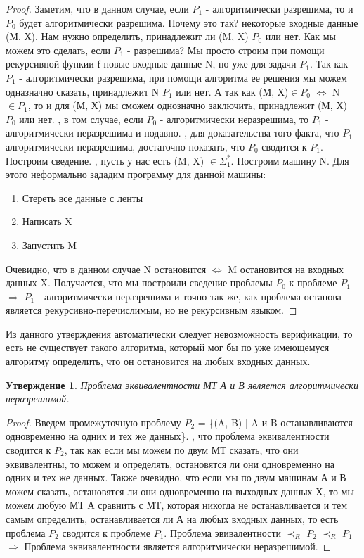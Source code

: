\documentclass[a4paper]{article}
\newtheorem{statement}{Утверждение}
\begin{document}
{\begin{proof}
Заметим, что в данном случае, если $P_1$ - алгоритмически разрешима, то и $P_0$ будет алгоритмически разрешима. Почему это так? 
 некоторые входные данные (М, Х). Нам нужно определить, принадлежит ли (M, X) $P_0$ или нет. Как мы можем это сделать, если $P_1$ - разрешима? Мы просто строим при помощи рекурсивной функии f новые входные данные N, но уже для задачи $P_1$. Так как $P_1$ - алгоритмически разрешима, при помощи алгоритма ее решения мы можем одназначно сказать, принадлежит N $P_1$ или нет. А так как (М, Х)$\in P_0$ $\Leftrightarrow$ N$\in P_1$, то и для (М, Х) мы сможем однозначно заключить, принадлежит (М, Х) $P_0$ или нет.
, в том случае, если $P_0$ - алгоритмически неразрешима, то $P_1$ - алгоритмически неразрешима и подавно. 
, для доказательства того факта, что $P_1$ алгоритмически неразрешима, достаточно показать, что $P_0$ сводится к $P_1$.
Построим сведение.
, пусть у нас есть (M, X) $\in \Sigma^*_1$. Построим машину N. Для этого неформально зададим программу для данной машины:
\begin{enumerate}
\item Стереть все данные с ленты
\item Написать X
\item Запустить M
\end{enumerate}
Очевидно, что в данном случае N остановится $\Leftrightarrow$ M остановится на входных данных X. Получается, что мы построили сведение проблемы $P_0$ к проблеме $P_1$ $\Rightarrow$ $P_1$ - алгоритмически неразрешима и точно так же, как проблема останова является рекурсивно-перечислимым, но не рекурсивным языком.
\end{proof}
Из данного утверждения автоматически следует невозможность верификации, то есть не существует такого алгоритма, который мог бы по уже имеющемуся алгоритму определить, что он остановится на любых входных данных.
\begin{statement}
Проблема эквивалентности МТ А и В является алгоритмически неразрешимой.
\end{statement}
\begin{proof}
Введем промежуточную проблему $P_2$ = \{(A, B) | A и B останавливаются одновременно на одних и тех же данных\}.
, что проблема эквивалентности сводится к $P_2$, так как если мы можем по двум МТ сказать, что они эквивалентны, то можем и определять, остановятся ли они одновременно на одних и тех же данных. 
\newline Также очевидно, что если мы по двум машинам А и В можем сказать, остановятся ли они одновременно на выходных данных Х, то мы можем любую МТ А сравнить с МТ, которая никогда не останавливается и тем самым определить, останавливается ли А на любых входных данных, то есть проблема $P_2$ сводится к проблеме $P_1$.
 Проблема эвивалентности $\prec_R$ $P_2$ $\prec_R$ $P_1$ $\Rightarrow$ Проблема эквивалентности является алгоритмически неразрешимой. 
\end{proof}

}
\end{document}

